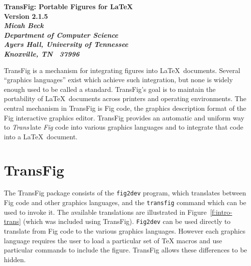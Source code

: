 
%


%
\newcommand{\version}{2.1.5}
%
\cfoot{\small Version \version}
%
\newcommand{\DVI}{{\sc dvi}}
\newcommand{\EPIC}{{\sc epic}}
\newcommand{\EEPIC}{{\sc eepic}}
\newcommand{\FTP}{{\tt FTP}}
\newcommand{\PIC}{{\sc pic}}
\newcommand{\PS}{{\sc ps}}
\newcommand{\psfig}{{\bf psfig}}
\newcommand{\PicTeX}{{PiC\TeX}}
\newcommand{\TFX}{{\sc tfx}}
\newcommand{\tpic}{{\tt tpic}}
\newcommand{\textyl}{{\TeX{tyl}}}
%


\begin{center}

\Large	\bf	TransFig: Portable Figures for \LaTeX\ \\
	\rm	Version \version \\[0.15in]

\large	\it	Micah Beck \\

\rm		Department of Computer Science \\
		Ayers Hall, University of Tennessee \\
		Knoxville, TN  ~37996 \\[0.15in]
\end{center}

TransFig is a mechanism for integrating figures into \LaTeX\ documents.
Several ``graphics languages'' exist which achieve such integration,
	but none is widely enough used to be called a standard.
TransFig's goal is to maintain the portability of \LaTeX\ documents across
	printers and operating environments.
The central mechanism in TransFig is Fig code,
	the graphics description format of the Fig interactive graphics editor.
TransFig provides an automatic and uniform way to
	{\it Trans}\,late {\it Fig} code into various graphics languages and
	to integrate that code into a \LaTeX\ document.

\section{TransFig}
The TransFig package consists of the {\tt fig2dev} program,
	which translates between Fig code and other graphics languages,
	and the {\tt transfig} command which can be used to invoke it.
The available translations are illustrated in Figure~\ref{f:intro-trans}
	(which was included using TransFig).
{\tt Fig2dev} can be used directly to translate from Fig code to
	the various graphics languages.
However each graphics language requires the user to load a particular set of
	TeX macros and use particular commands to include the figure.
TransFig allows these differences to be hidden.

